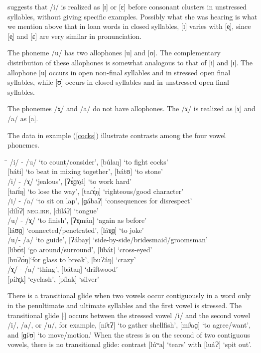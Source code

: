 \citet[24]{harmon1977} suggests that /i/ is realized as [ɪ] or [ɛ] before consonant clusters in unstressed syllables, without giving specific examples. Possibly what she was hearing is what we mention above that in loan words in closed syllables, [ɪ] varies with [e̞], since [e̞] and [ɛ] are very similar in pronunciation.

The phoneme /u/ has two allophones [u] and [ʊ]. The complementary distribution of these allophones is somewhat analogous to that of [i] and [ɪ]. The allophone [u] occurs in open non-final syllables and in stressed open final syllables, while [ʊ] occurs in closed syllables and in unstressed open final syllables.

The phonemes /ɤ̞/ and /a/ do not have allophones. The /ɤ̞/ is realized as [ɤ̞] and /a/ as [a].

\largerpage
The data in example (\ref{cocks}) illustrate contrasts among the four vowel phonemes.
\ea
\label{cocks}
\begin{tabbing}
\hspace{1.3cm} \= \kill
/i/ - /u/ \> [bílaŋ] ‘to count/consider’, [búlaŋ] ‘to fight cocks’ \\
\>{}[báti] ‘to beat in mixing together’, [bátʊ] ‘to stone’ \\
/i/ - /ɤ̞/ \> [Ɂíɡɤ̞d] ‘jealous’, [Ɂɤ̞́ɡɤ̞d] ‘to work hard’ \\
\> {}[taɾɪ́ŋ] ‘to lose the way’, [taɾɤ̞́ŋ] ‘righteous/good character’ \\
/i/ - /a/ \> [ɡíba] ‘to sit on lap’, [ɡábaʔ] ‘consequences for disrespect’ \\
\> {}[dilɪ́Ɂ] \textsc{neg.irr}, [diláʔ] ‘tongue’ \\
/u/ - /ɤ̞/ \> [Ɂumán] ‘to finish’, [Ɂɤ̞mán] ‘again as before’ \\
\> {}[láʊɡ] ‘connected/penetrated’, [láɤ̞ɡ] ‘to joke’ \\
/u/- /a/ \> [Ɂúbay] ‘to guide’, [Ɂábay] ‘side-by-side/bridesmaid/groomsman’ \\
\>{}[libʊ́t] ‘go around/surround’, [libát] ‘cross-eyed’ \\
\> {}[buɁʊ́ŋ]‘for glass to break’, [buɁáŋ] ‘crazy’ \\
/ɤ̞/ - /a/ \> [bɤ̞́taŋ] ‘thing’, [bátaŋ] ‘driftwood’ \\
\> {}[pílɤ̞k] ‘eyelash’, [pílak] ‘silver’
\end{tabbing}
\z

There is a transitional glide when two vowels occur contiguously in a word only in the penultimate and ultimate syllables and the first vowel is stressed. The transitional glide [ʲ] occurs between the stressed vowel /i/ and the second vowel /i/, /a/, or /u/, for example, [níʲɪɁ] ‘to gather shellfish’, [míʲaɡ] ‘to agree/want’, and [ɡíʲʊ] ‘to move/motion.’ When the stress is on the second of two contiguous vowels, there is no transitional glide: contrast [lúʷa] ‘tears’ with [luáɁ] ‘spit out’.

